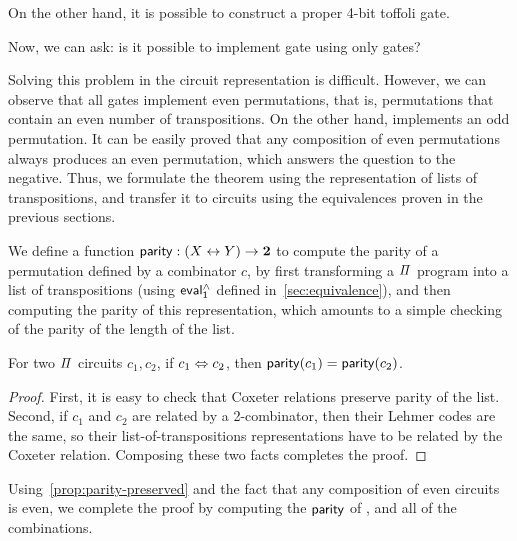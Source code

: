 \noindent
On the other hand, it is possible to construct a proper 4-bit toffoli gate.
\medskip
\toffoli{}

\noindent
Now, we can ask: is it possible to implement  gate using only  gates?
\medskip

Solving this problem in the circuit representation is difficult. However, we can observe that all  gates
implement even permutations, that is, permutations that contain an even number of transpositions. On the other hand,
 implements an odd permutation. It can be easily proved that any composition of even permutations always
produces an even permutation, which answers the question to the negative. Thus, we formulate the theorem using the
representation of lists of transpositions, and transfer it to circuits using the equivalences proven in the previous
sections.

We define a function $\operatorname{\mathsf{parity}} : (X \mathrel{\leftrightarrow} Y) \to {\mathbf{2}}$ to compute the parity of a permutation defined by a combinator
$c$, by first transforming a $\mathit{\Pi}$ program into a list of transpositions (using $\evalh_{1}$ defined
in~\cref{sec:equivalence}), and then computing the parity of this representation, which amounts to a simple checking of
the parity of the length of the list.

\begin{propositionrep}
  \label{prop:parity-preserved}
  For two $\mathit{\Pi}$ circuits $c_1, c_2$, if $c_1 \mathrel{\Leftrightarrow} c_2$, then $\operatorname{\mathsf{parity}}(c_1) = \operatorname{\mathsf{parity}}(c_2)$.
\end{propositionrep}
\begin{proof}
  First, it is easy to check that Coxeter relations preserve parity of the list. Second, if $c_1$ and $c_2$ are related
  by a 2-combinator, then their Lehmer codes are the same, so their list-of-transpositions representations have to be
  related by the Coxeter relation. Composing these two facts completes the proof.
\end{proof}

\noindent
Using~\cref{prop:parity-preserved} and the fact that any composition of even circuits is even, we complete the proof by
computing the $\operatorname{\mathsf{parity}}$ of , and all of the  combinations.


